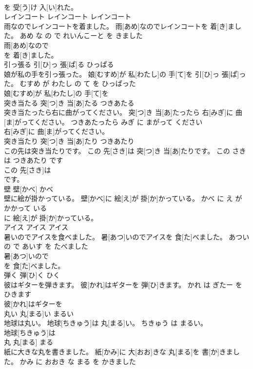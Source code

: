 \documentclass[8pt]{extreport}
\begin{document}
\begin{CJK}{UTF8}{min}
\\	を 受[う]け 入[い]れた。			
\\	レインコート	レインコート	レインコート	
\\	雨なのでレインコートを着ました。	雨[あめ]なのでレインコートを 着[き]ました。	あめ な の で れいんこーと を きました	
\\	雨[あめ]なので
\\	を 着[き]ました。			
\\	引っ張る	引[ひ]っ 張[ぱ]る	ひっぱる	
\\	娘が私の手を引っ張った。	娘[むすめ]が 私[わたし]の 手[て]を 引[ひ]っ 張[ぱ]った。	むすめ が わたし の て を ひっぱった	
\\	娘[むすめ]が 私[わたし]の 手[て]を
\\	突き当たる	突[つ]き 当[あ]たる	つきあたる	
\\	突き当たったら右に曲がってください。	突[つ]き 当[あ]たったら 右[みぎ]に 曲[ま]がってください。	つきあたったら みぎ に まがって ください	
\\	右[みぎ]に 曲[ま]がってください。			
\\	突き当たり	突[つ]き 当[あ]たり	つきあたり	
\\	この先は突き当たりです。	この 先[さき]は 突[つ]き 当[あ]たりです。	この さき は つきあたり です	
\\	この 先[さき]は
\\	です。			
\\	壁	壁[かべ]	かべ	
\\	壁に絵が掛かっている。	壁[かべ]に 絵[え]が 掛[か]かっている。	かべ に え が かかって いる	
\\	に 絵[え]が 掛[か]かっている。			
\\	アイス	アイス	アイス	
\\	暑いのでアイスを食べました。	暑[あつ]いのでアイスを 食[た]べました。	あつい の で あいす を たべました	
\\	暑[あつ]いので
\\	を 食[た]べました。			
\\	弾く	弾[ひ]く	ひく	
\\	彼はギターを弾きます。	彼[かれ]はギターを 弾[ひ]きます。	かれ は ぎたー を ひきます	
\\	彼[かれ]はギターを
\\	丸い	丸[まる]い	まるい	
\\	地球は丸い。	地球[ちきゅう]は 丸[まる]い。	ちきゅう は まるい。	
\\	地球[ちきゅう]は
\\	丸	丸[まる]	まる	
\\	紙に大きな丸を書きました。	紙[かみ]に 大[おお]きな 丸[まる]を 書[か]きました。	かみ に おおき な まる を かきました	

\end{CJK}
\end{document}
